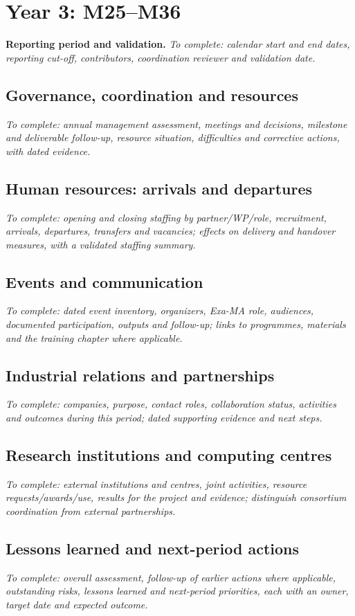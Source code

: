 \clearpage
\section{Year 3: M25--M36}
\label{sec:management-year-3}

\textbf{Reporting period and validation.}
\emph{To complete: calendar start and end dates, reporting cut-off, contributors,
coordination reviewer and validation date.}

\subsection{Governance, coordination and resources}
\emph{To complete: annual management assessment, meetings and decisions,
milestone and deliverable follow-up, resource situation, difficulties and
corrective actions, with dated evidence.}

\subsection{Human resources: arrivals and departures}
\emph{To complete: opening and closing staffing by partner/WP/role, recruitment,
arrivals, departures, transfers and vacancies; effects on delivery and handover
measures, with a validated staffing summary.}

\subsection{Events and communication}
\emph{To complete: dated event inventory, organizers, Exa-MA role, audiences,
documented participation, outputs and follow-up; links to programmes, materials
and the training chapter where applicable.}

\subsection{Industrial relations and partnerships}
\emph{To complete: companies, purpose, contact roles, collaboration status,
activities and outcomes during this period; dated supporting evidence and
next steps.}

\subsection{Research institutions and computing centres}
\emph{To complete: external institutions and centres, joint activities,
resource requests/awards/use, results for the project and evidence;
distinguish consortium coordination from external partnerships.}

\subsection{Lessons learned and next-period actions}
\emph{To complete: overall assessment, follow-up of earlier actions where
applicable, outstanding risks, lessons learned and next-period priorities,
each with an owner, target date and expected outcome.}
